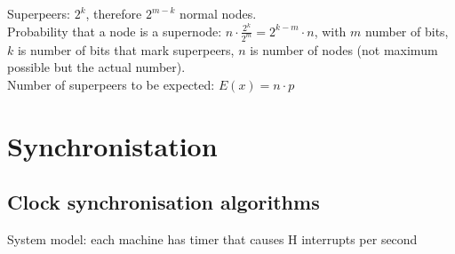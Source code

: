 \documentclass[ngerman,a4paper]{report}
\begin{document}
Superpeers: $2^k$, therefore $2^{m-k}$ normal nodes.\\
Probability that a node is a supernode: $n\cdot \frac{2^k}{2^m} = 2^{k-m} \cdot n$, with $m$ number of bits, $k$ is number of bits that mark superpeers, $n$ is number of nodes (not maximum possible but the actual number).\\
Number of superpeers to be expected: $E(x)= n\cdot p$\\

\chapter{Synchronistation}
\section{Clock synchronisation algorithms}
System model: each machine has timer that causes H interrupts per second
\end{document}
